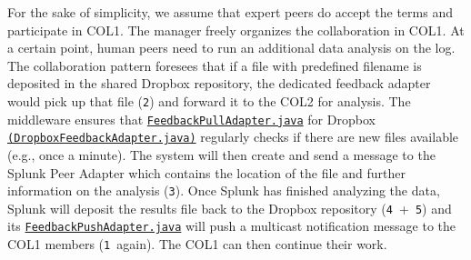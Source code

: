 \documentclass{llncs}
\begin{document}
    For the sake of simplicity, we assume that expert peers do accept the terms and participate in COL1. The manager freely organizes the collaboration in COL1. At a certain point, human peers need to run an additional data analysis on the log. The collaboration pattern foresees that if a file with predefined filename is deposited in the shared Dropbox repository, the dedicated feedback adapter would pick up that file (\texttt{2}\degree) and forward it to the COL2 for analysis. The middleware ensures that \texttt{\href{https://github.com/tuwiendsg/SmartCom/blob/master/api/src/main/java/at/ac/tuwien/dsg/smartcom/adapter/InputPullAdapter.java}{FeedbackPullAdapter.java}} for Dropbox \texttt{\href{https://github.com/tuwiendsg/SmartCom/blob/master/impl/src/main/java/at/ac/tuwien/dsg/smartcom/adapters/DropboxInputAdapter.java}{(DropboxFeedbackAdapter.java)}} regularly checks if there are new files available (e.g., once a minute).
	  The system will then create and send a message to the Splunk Peer Adapter which contains the location of the file and further information on the analysis (\texttt{3}\degree). Once Splunk has finished analyzing the data, Splunk will deposit the results file back to the Dropbox repository (\texttt{4}\degree~+~\texttt{5}\degree) and its \texttt{\href{https://github.com/tuwiendsg/SmartCom/blob/master/api/src/main/java/at/ac/tuwien/dsg/smartcom/adapter/InputPushAdapter.java}{FeedbackPushAdapter.java}} will push a multicast notification message to the COL1 members (\texttt{1}\degree~again). The COL1 can then continue their work.


\end{document}
